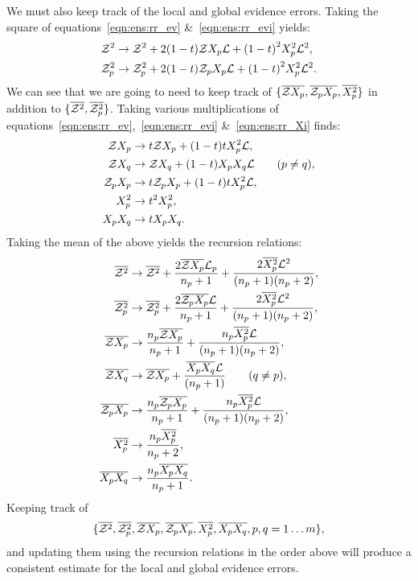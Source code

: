 We must also keep track of the local and global evidence errors. Taking the square of equations~\eqref{eqn:ens:rr_ev} \&~\eqref{eqn:ens:rr_evi} yields:
%
\begin{align}
  \mathcal{Z}^2 &\to \mathcal{Z}^2 + 2 (1-t) \mathcal{Z} X_p \mathcal{L} +  {(1-t)}^2 X_p^2 \mathcal{L}^2, \\
  \mathcal{Z}_p^2 &\to \mathcal{Z}_p^2 + 2 (1-t) \mathcal{Z}_p X_p \mathcal{L} +  {(1-t)}^2 X_p^2 \mathcal{L}^2.
\end{align}
%
We can see that we are going to need to keep track of \(\{\overline{\mathcal{Z} X_p}, \overline{\mathcal{Z}_p X_p}, \overline{X_p^2}\}\) in addition to \(\{ \overline{\mathcal{Z}^2}, \overline{\mathcal{Z}_p^2} \}\). Taking various multiplications of equations~\eqref{eqn:ens:rr_ev},~\eqref{eqn:ens:rr_evi} \&~\eqref{eqn:ens:rr_Xi} finds:
%
\begin{align}
  \mathcal{Z} X_p   &\to t \mathcal{Z} X_p + (1-t)t X_p^2 \mathcal{L}, \\
  \mathcal{Z} X_q   &\to   \mathcal{Z} X_q + (1-t) X_p X_q \mathcal{L} \qquad (p\ne q),   \\
  \mathcal{Z}_p X_p &\to t \mathcal{Z}_p X_p + (1-t)t X_p^2 \mathcal{L}, \\
  X_p^2     &\to t^2 X_p^2, \\
  X_p X_q   &\to t   X_p X_q.
\end{align}
%
Taking the mean of the above yields the recursion relations:
\begin{align}
  \overline{\mathcal{Z}^2} &\to \overline{\mathcal{Z}^2} + \frac{2\overline{\mathcal{Z} X_p}\mathcal{L}_p}{n_p+1}  + \frac{2\overline{X_p^2}\mathcal{L}^2}{(n_p+1)(n_p+2)}, \\
  \overline{\mathcal{Z}_p^2} &\to \overline{\mathcal{Z}_p^2} + \frac{2\overline{\mathcal{Z}_p X_p}\mathcal{L}}{n_p+1}  + \frac{2\overline{X_p^2}\mathcal{L}^2}{(n_p+1)(n_p+2)}, \\
  \overline{\mathcal{Z} X_p} &\to \frac{n_p\overline{\mathcal{Z} X_p}}{n_p+1}  + \frac{n_p\overline{X_p^2} \mathcal{L}}{(n_p+1)(n_p+2)},   \\
  \overline{\mathcal{Z} X_q} &\to \overline{\mathcal{Z} X_p}  + \frac{\overline{X_p X_q} \mathcal{L}}{(n_p+1)} \qquad (q\ne p),  \\
  \overline{\mathcal{Z}_p X_p} &\to \frac{n_p\overline{\mathcal{Z}_p X_p}}{n_p+1}  + \frac{n_p\overline{X_p^2} \mathcal{L}}{(n_p+1)(n_p+2)},   \\
  \overline{X_p^2} &\to \frac{n_p\overline{X_p^2}}{n_p+2}, \\
  \overline{X_p X_q} &\to \frac{n_p\overline{X_p X_q}}{n_p+1}.
\end{align}
Keeping track of 
\[\{\overline{\mathcal{Z}^2},\overline{\mathcal{Z}_p^2},\overline{\mathcal{Z} X_p},\overline{\mathcal{Z}_p X_p},\overline{X_p^2},\overline{X_p X_q},p,q=1\ldots m\},\]
and updating them using the recursion relations in the order above will produce a consistent estimate for the local and global evidence errors.




